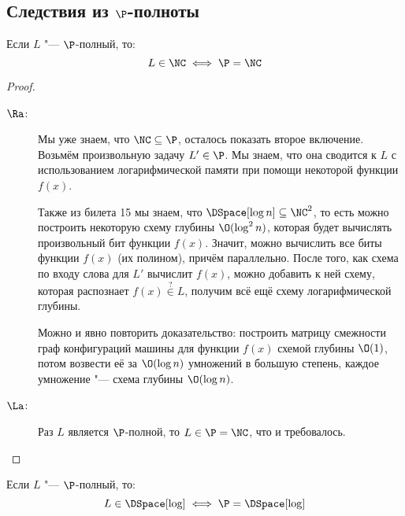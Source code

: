 \subsection[Следствия из P-полноты]{Следствия из $\P$-полноты}
	\begin{theorem}
		Если $L$ "--- $\P$-полный, то:
		\[ L \in \NC \iff \P = \NC \]
	\end{theorem}
	\begin{proof}
		\begin{description}
			\item[$\Ra$:]
				Мы уже знаем, что $\NC \subseteq \P$, осталось показать второе включение.
				Возьмём произвольную задачу $L' \in \P$.
				Мы знаем, что она сводится к $L$ с использованием логарифмической памяти
				при помощи некоторой функции $f(x)$.

				Также из билета 15 мы знаем, что $\DSpace[\log n] \subseteq \NC^2$, то есть можно
				построить некоторую схему глубины $\O(\log^2 n)$, которая будет вычислять произвольный
				бит функции $f(x)$.
				Значит, можно вычислить все биты функции $f(x)$ (их полином), причём параллельно.
				После того, как схема по входу слова для $L'$ вычислит $f(x)$, можно добавить к ней схему,
				которая распознает $f(x) \stackrel{?}{\in} L$, получим всё ещё схему логарифмической глубины.
				\begin{Rem}
					Можно и явно повторить доказательство:
					построить матрицу смежности граф конфигураций машины для функции $f(x)$ схемой глубины $\O(1)$,
					потом возвести её за $\O(\log n)$ умножений в большую степень, каждое умножение "--- схема глубины $\O(\log n)$.
				\end{Rem}
			\item[$\La$:]
				Раз $L$ является $\P$-полной, то $L\in \P = \NC$, что и требовалось.
		\end{description}
	\end{proof}
	\begin{theorem}
		Если $L$ "--- $\P$-полный, то:
		\[ L \in \DSpace[\log] \iff \P = \DSpace[\log] \]
	\end{theorem}
